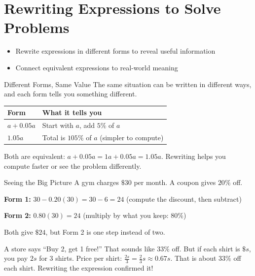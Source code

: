 \section{Rewriting Expressions to Solve Problems}

\begin{learningGoals}
\begin{itemize}
    \item Rewrite expressions in different forms to reveal useful information
    \item Connect equivalent expressions to real-world meaning
\end{itemize}
\end{learningGoals}

\begin{conceptBox}{Different Forms, Same Value}
The same situation can be written in different ways, and each form tells you something different.
\begin{center}
\begin{tabular}{l l}
    \textbf{Form} & \textbf{What it tells you} \\
    \hline
    $a + 0.05a$ & Start with $a$, add $5\%$ of $a$ \\
    $1.05a$ & Total is $105\%$ of $a$ (simpler to compute) \\
\end{tabular}
\end{center}
Both are equivalent: $a + 0.05a = 1a + 0.05a = 1.05a$.
Rewriting helps you compute faster or see the problem differently.
\end{conceptBox}

\begin{workedExample}{Seeing the Big Picture}
A gym charges $\$30$ per month. A coupon gives $20\%$ off.

\textbf{Form 1:} $30 - 0.20(30) = 30 - 6 = 24$ (compute the discount, then subtract)

\textbf{Form 2:} $0.80(30) = 24$ (multiply by what you keep: $80\%$)

Both give $\$24$, but Form 2 is one step instead of two.
\end{workedExample}

\begin{realWorld}
A store says ``Buy 2, get 1 free!'' That sounds like $33\%$ off. But if each shirt is $\$s$, you pay $2s$ for $3$ shirts. Price per shirt: $\frac{2s}{3} = \frac{2}{3}s \approx 0.67s$. That is about $33\%$ off each shirt. Rewriting the expression confirmed it!
\end{realWorld}

